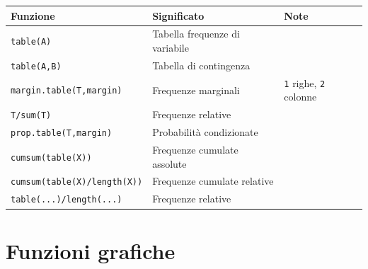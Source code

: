 \documentclass[
  a4paper,
  DIV=11,
  numbers=noendperiod]{scrreprt}
\begin{document}
\begin{longtable}[]{@{}
  >{\raggedright\arraybackslash}p{}
  >{\raggedright\arraybackslash}p{}
  >{\raggedright\arraybackslash}p{}@{}}
\toprule\noalign{}
\begin{minipage}[b]{\linewidth}\raggedright
Funzione
\end{minipage} & \begin{minipage}[b]{\linewidth}\raggedright
Significato
\end{minipage} & \begin{minipage}[b]{\linewidth}\raggedright
Note
\end{minipage} \\
\midrule\noalign{}
\endhead
\bottomrule\noalign{}
\endlastfoot
\texttt{table(A)} & Tabella frequenze di variabile & \\
\texttt{table(A,B)} & Tabella di contingenza & \\
\texttt{margin.table(T,margin)} & Frequenze marginali & \texttt{1}
righe, \texttt{2} colonne \\
\texttt{T/sum(T)} & Frequenze relative & \\
\texttt{prop.table(T,margin)} & Probabilità condizionate & \\
\texttt{cumsum(table(X))} & Frequenze cumulate assolute & \\
\texttt{cumsum(table(X)/length(X))} & Frequenze cumulate relative & \\
\texttt{table(...)/length(...)} & Frequenze relative & \\
\end{longtable}

\section{Funzioni grafiche}\label{funzioni-grafiche}
\end{document}
